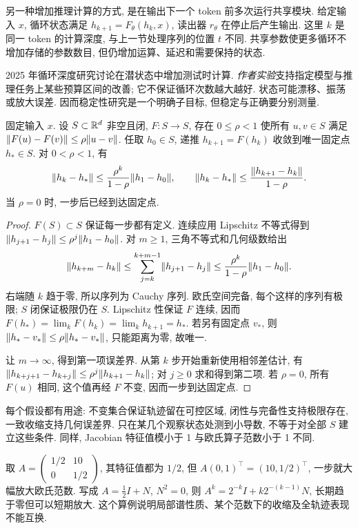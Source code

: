 另一种增加推理计算的方式, 是在输出下一个 token 前多次运行共享模块. 给定输入 $x$, 循环状态满足 $h_{k+1}=F_\theta(h_k,x)$, 读出器 $r_\theta$ 在停止后产生输出. 这里 $k$ 是同一 token 的计算深度, 与上一节处理序列的位置 $t$ 不同. 共享参数使更多循环不增加存储的参数数目, 但仍增加运算、延迟和需要保持的状态.

2025 年循环深度研究讨论在潜状态中增加测试时计算\cite{latent}. \emph{作者实验}支持指定模型与推理任务上某些预算区间的改善; 它不保证循环次数越大越好. 状态可能漂移、振荡或放大误差. 因而稳定性研究是一个明确子目标, 但稳定与正确要分别测量.

\begin{theorem}[收缩递推]\label{thm:recurrent-contraction}
固定输入 $x$. 设 $S\subset\mathbb R^d$ 非空且闭, $F:S\to S$, 存在 $0\le\rho<1$ 使所有 $u,v\in S$ 满足 $\lVert F(u)-F(v)\rVert\le\rho\lVert u-v\rVert$. 任取 $h_0\in S$, 递推 $h_{k+1}=F(h_k)$ 收敛到唯一固定点 $h_*\in S$. 对 $0<\rho<1$, 有
\[
\lVert h_k-h_*\rVert\le\frac{\rho^k}{1-\rho}\lVert h_1-h_0\rVert,\qquad
\lVert h_k-h_*\rVert\le\frac{\lVert h_{k+1}-h_k\rVert}{1-\rho}.
\]
当 $\rho=0$ 时, 一步后已经到达固定点.
\end{theorem}
\begin{proof}
$F(S)\subset S$ 保证每一步都有定义. 连续应用 Lipschitz 不等式得到 $\lVert h_{j+1}-h_j\rVert\le\rho^j\lVert h_1-h_0\rVert$. 对 $m\ge1$, 三角不等式和几何级数给出
\[
\lVert h_{k+m}-h_k\rVert\le\sum_{j=k}^{k+m-1}\lVert h_{j+1}-h_j\rVert
\le\frac{\rho^k}{1-\rho}\lVert h_1-h_0\rVert.
\]
右端随 $k$ 趋于零, 所以序列为 Cauchy 序列. 欧氏空间完备, 每个这样的序列有极限; $S$ 闭保证极限仍在 $S$. Lipschitz 性保证 $F$ 连续, 因而 $F(h_*)=\lim_kF(h_k)=\lim_kh_{k+1}=h_*$. 若另有固定点 $v_*$, 则 $\lVert h_*-v_*\rVert\le\rho\lVert h_*-v_*\rVert$, 只能距离为零, 故唯一.

让 $m\to\infty$, 得到第一项误差界. 从第 $k$ 步开始重新使用相邻差估计, 有 $\lVert h_{k+j+1}-h_{k+j}\rVert\le\rho^j\lVert h_{k+1}-h_k\rVert$; 对 $j\ge0$ 求和得到第二项. 若 $\rho=0$, 所有 $F(u)$ 相同, 这个值再经 $F$ 不变, 因而一步到达固定点.
\end{proof}
每个假设都有用途: 不变集合保证轨迹留在可控区域, 闭性与完备性支持极限存在, 一致收缩支持几何误差界. 只在某几个观察状态处测到小导数, 不等于对全部 $S$ 建立这些条件. 同样, Jacobian 特征值模小于 1 与欧氏算子范数小于 1 不同.

取 $A=\begin{pmatrix}1/2&10\\0&1/2\end{pmatrix}$, 其特征值都为 $1/2$, 但 $A(0,1)^\top=(10,1/2)^\top$, 一步就大幅放大欧氏范数. 写成 $A=\frac12 I+N$, $N^2=0$, 则 $A^k=2^{-k}I+k2^{-(k-1)}N$, 长期趋于零但可以短期放大. 这个算例说明局部谱性质、某个范数下的收缩及全轨迹表现不能互换.


